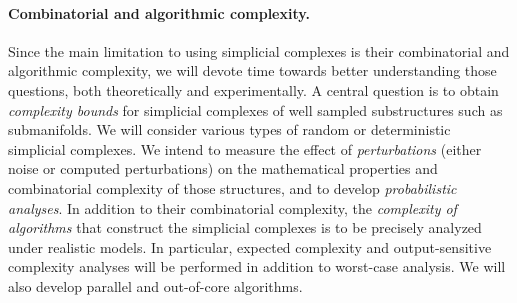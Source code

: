 



\paragraph{Combinatorial and algorithmic complexity.}

Since the main limitation to using simplicial complexes is their combinatorial and algorithmic complexity, we will devote time towards better understanding those questions, both theoretically and experimentally.  %
A central question is to obtain {\em complexity bounds} for simplicial complexes of well sampled substructures such as submanifolds. We will consider various types of random or deterministic simplicial complexes.  We intend to measure the effect of {\em perturbations} (either noise or computed perturbations) on the mathematical properties and combinatorial complexity of those structures, and to develop {\em probabilistic analyses}.  In addition to their combinatorial complexity, the {\em complexity of algorithms} that construct the simplicial complexes is to be precisely analyzed under realistic models. In particular, expected complexity and output-sensitive complexity analyses will be performed in addition to worst-case analysis. %
We will also develop parallel and out-of-core algorithms.%


